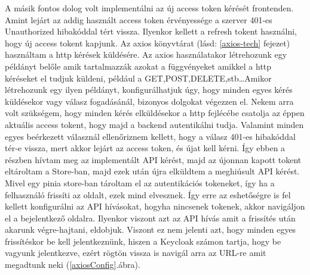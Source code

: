 \documentclass[a4paper,twoside]{article}
\begin{document}
A másik fontos dolog volt implementálni az új access token kérését frontenden. Amint lejárt az addig használt access token érvényessége a szerver 401-es Unauthorized 
hibakóddal tért vissza. Ilyenkor kellett a refresh tokent használni, hogy új access tokent kapjunk. Az axios könyvtárat (lásd: \ref{axios-tech} fejezet) használtam a http kérések küldésére. Az axios 
használatakor létrehozunk egy példányt belőle amik tartalmazzák azokat a függvényeket amikkel a http kéréseket el tudjuk küldeni, például a GET,POST,DELETE,stb\ldots Amikor létrehozunk egy ilyen példányt, konfigurálhatjuk úgy, hogy minden egyes kérés küldésekor vagy válasz fogadásánál, bizonyos dolgokat végezzen el. Nekem arra volt szükségem, hogy minden kérés elküldésekor a http fejlécébe csatolja az éppen aktuális access tokent, hogy majd a backend autentikálni tudja. Valamint minden egyes beérkezett válasznál ellenőriznem kellett, hogy a válasz 401-es hibakóddal tér-e vissza, mert akkor lejárt az access token, és újat kell kérni. Így ebben a részben hívtam meg az implementált API kérést, majd az újonnan kapott tokent eltároltam a Store-ban, majd ezek után újra elküldtem a meghiúsult API kérést. Mivel egy 
pinia store-ban tároltam el az autentikációs tokeneket, így ha a felhasználó frissíti az oldalt, ezek mind elvesznek. Így erre az eshetőségre is fel kellett konfigurálni az API hívásokat, hogyha nincsenek tokenek, akkor navigáljon el a bejelentkező oldalra. Ilyenkor viszont azt az API hívás amit a frissítés után akarunk végre-hajtani, eldobjuk. Viszont ez nem jelenti azt, hogy minden egyes frissítéskor be kell jelentkeznünk, hiszen a Keycloak számon tartja, hogy be vagyunk jelentkezve, ezért rögtön vissza is navigál arra az URL-re amit megadtunk neki (\ref{axiosConfig}.ábra).
\end{document}

